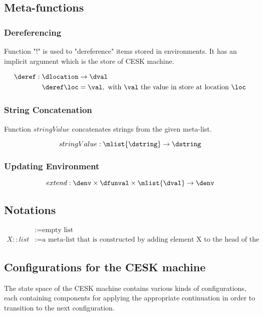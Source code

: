 \documentclass{article}
\begin{document}
\subsection{Meta-functions}
\label{subsec:meta-functions}
\subsubsection{Dereferencing}
\label{subsubsection:dereferecing}
Function "!" is used to "dereference" items stored in environments. It has an implicit argument which is the store of CESK machine.

\begin{align*}
\deref : \dlocation &\rightarrow \dval \\
\deref\loc &=  \val, \textrm{ with $\val$ the value in store at location } \loc
\end{align*}

\subsubsection{String Concatenation}
\label{subsubsec:string-concatenation}
Function $stringValue$ concatenates strings from the given meta-list.

\[stringValue : \mlist{\dstring} \rightarrow \dstring\]

\subsubsection{Updating Environment}
\label{subsubsec:updating-env}

\[extend : \denv \times \dfunval \times \mlist{\dval} \rightarrow  \denv \]

\subsection{Notations}
\label{subsec:notations}

\begin{align*}
[]	&:= \textrm{empty list} \\
X :: list	&:= \textrm{a meta-list that is constructed by adding element X to the head of the meta-list list}
\end{align*}

\subsection{Configurations for the CESK machine}
\label{subsec:cesk-configs}
The state space of the CESK machine contains various kinds of configurations, each containing components for applying the appropriate continuation in order to transition to the next configuration. 
\end{document}
